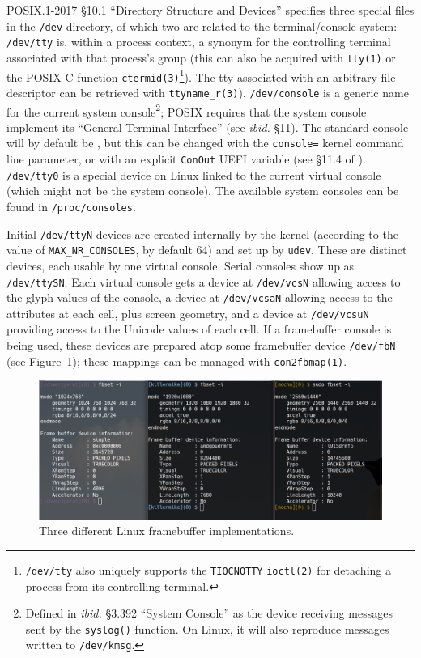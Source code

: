 POSIX.1-2017\cite{posix2017} §10.1 ``Directory Structure and Devices''
specifies three special files in the \texttt{/dev} directory, of which two are
related to the terminal/console system: \texttt{/dev/tty} is, within a process
context, a synonym for the controlling terminal associated with that process's
group (this can also be acquired with \texttt{tty(1)} or the POSIX C function
\texttt{ctermid(3)}\footnote{\texttt{/dev/tty} also uniquely supports the
\texttt{TIOCNOTTY} \texttt{ioctl(2)} for detaching a process from its
controlling terminal.}). The tty associated with an arbitrary file descriptor can
be retrieved with \texttt{ttyname\_r(3)}). \texttt{/dev/console} is a generic name for the current system console\footnote{Defined in \textit{ibid.} §3.392
``System Console'' as the device receiving messages sent by the \texttt{syslog()}
function. On Linux, it will also reproduce messages written to \texttt{/dev/kmsg}\cite{dmesg}.};
POSIX requires that the system console implement its ``General Terminal Interface'' (see
\textit{ibid.} §11). The standard console will by default be , but this
can be changed with the \texttt{console=} kernel command line parameter, or with
an explicit \texttt{ConOut} UEFI variable (see §11.4 of \cite{uefi}). \texttt{/dev/tty0} is a special device on Linux linked to
the current virtual console (which might not be the system console). The
available system consoles can be found in \texttt{/proc/consoles}.

Initial \texttt{/dev/ttyN} devices are created internally by the kernel
(according to the value of \texttt{MAX\_NR\_CONSOLES}, by default 64) and set
up by \texttt{udev}. These are distinct devices, each usable by one virtual
console. Serial consoles show up as \texttt{/dev/ttySN}\cite{ttys4}. Each
virtual console gets a device at \texttt{/dev/vcsN} allowing access to the
glyph values of the console, a device at \texttt{/dev/vcsaN} allowing access to
the attributes at each cell, plus screen geometry, and a device at \texttt{/dev/vcsuN}
providing access to the Unicode values of each cell\cite{vcs4}. If a framebuffer console
is being used, these devices are prepared atop some framebuffer device \texttt{/dev/fbN} (see
Figure~\ref{fig:framebuffers}); these mappings can be managed with \texttt{con2fbmap(1)}.

\begin{figure}[!htb]
  \centering
  \includegraphics[width=.75\linewidth]{media/framebuffers.png}
  \caption{Three different Linux framebuffer implementations.}
  \label{fig:framebuffers}
\end{figure}

